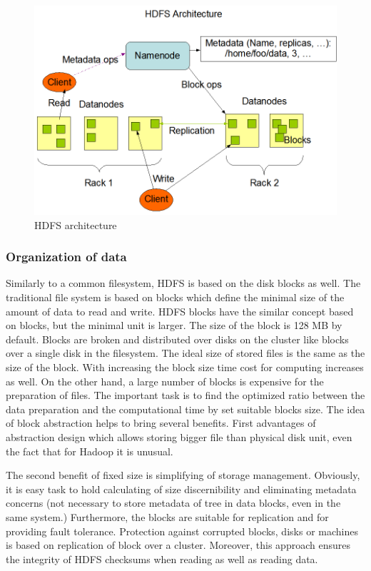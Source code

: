 \documentclass[a4paper,12pt,oneside]{report}
\begin{document}
\begin{figure}[h!]
    \centering
    \includegraphics[width=1\textwidth]{./img/hdfsarchitecture.png}
    \caption[HDFS architecture1]{\centering HDFS architecture \footnotemark}
\end{figure} 

		\subsubsection{Organization of data}
Similarly to  a common filesystem, HDFS is based on the disk blocks as well. The traditional
file system is based on blocks which define the minimal size of the amount of data to read and write.
HDFS blocks have the similar concept based on blocks, but the minimal unit is
larger. The size of the block is 128 MB by default. Blocks are broken and distributed
over disks on the cluster like blocks over a single disk in the filesystem. The ideal 
size of stored files is the same as the size of the block. With increasing the block 
size time cost for computing increases as well. On the other hand, a large number
of blocks is expensive for the preparation of files. The important task is to find the optimized 
ratio between the data preparation and the computational time by set suitable blocks size.
The idea of block abstraction helps to bring several benefits. First advantages of
abstraction design which allows storing bigger file than physical disk unit, 
even the fact that for Hadoop it is unusual.

The second benefit of fixed size is simplifying of storage management. Obviously, it is easy task
to hold calculating of size discernibility and eliminating metadata concerns (not necessary 
to store metadata of tree in data blocks, even in the same system.)
Furthermore, the blocks are suitable for replication and for providing fault tolerance. Protection
against corrupted blocks, disks or machines is based on replication of block over a cluster. 
Moreover, this approach ensures the integrity of HDFS checksums when reading as well as reading data.
\end{document}

